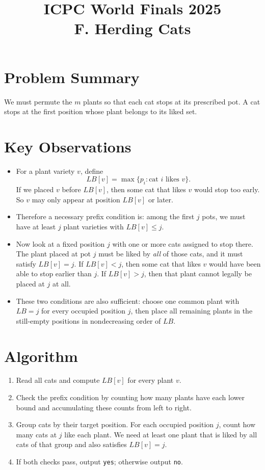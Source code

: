 \documentclass[11pt]{article}
\title{ICPC World Finals 2025\\F. Herding Cats}
\author{}
\date{}
\begin{document}
\maketitle

\section*{Problem Summary}

We must permute the $m$ plants so that each cat stops at its prescribed pot. A cat stops at the first
position whose plant belongs to its liked set.

\section*{Key Observations}

\begin{itemize}[leftmargin=*]
    \item For a plant variety $v$, define
    \[
    LB[v] = \max \{p_i : \text{cat } i \text{ likes } v\}.
    \]
    If we placed $v$ before $LB[v]$, then some cat that likes $v$ would stop too early. So $v$ may only
    appear at position $LB[v]$ or later.
    \item Therefore a necessary prefix condition is:
    among the first $j$ pots, we must have at least $j$ plant varieties with $LB[v] \le j$.
    \item Now look at a fixed position $j$ with one or more cats assigned to stop there.
    The plant placed at pot $j$ must be liked by \emph{all} of those cats, and it must satisfy $LB[v]=j$.
    If $LB[v] < j$, then some cat that likes $v$ would have been able to stop earlier than $j$.
    If $LB[v] > j$, then that plant cannot legally be placed at $j$ at all.
    \item These two conditions are also sufficient:
    choose one common plant with $LB=j$ for every occupied position $j$, then place all remaining plants
    in the still-empty positions in nondecreasing order of $LB$.
\end{itemize}

\section*{Algorithm}

\begin{enumerate}[leftmargin=*]
    \item Read all cats and compute $LB[v]$ for every plant $v$.
    \item Check the prefix condition by counting how many plants have each lower bound and accumulating
    these counts from left to right.
    \item Group cats by their target position.
    For each occupied position $j$, count how many cats at $j$ like each plant.
    We need at least one plant that is liked by all cats of that group and also satisfies $LB[v]=j$.
    \item If both checks pass, output \texttt{yes}; otherwise output \texttt{no}.
\end{enumerate}
\end{document}
